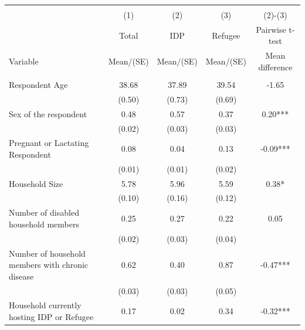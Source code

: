 
\begin{tabular}{@{\extracolsep{5pt}}lcccc}
\\[-1.8ex]\hline \hline \\[-1.8ex]
 & \multicolumn{1}{c}{(1)}  & \multicolumn{1}{c}{(2)}  & \multicolumn{1}{c}{(3)}  & \multicolumn{1}{c}{(2)-(3)} \\
 & \multicolumn{1}{c}{Total}  & \multicolumn{1}{c}{IDP}  & \multicolumn{1}{c}{Refugee}  & \multicolumn{1}{c}{Pairwise t-test}  \\
Variable & Mean/(SE) & Mean/(SE) & Mean/(SE) & Mean difference \\ \hline \\[-1.8ex] 
Respondent Age   & 38.68    & 37.89    & 39.54    & -1.65   \\
 & (0.50)  & (0.73)  & (0.69)  &  \\ [1ex]
Sex of the respondent   & 0.48    & 0.57    & 0.37    & 0.20***   \\
 & (0.02)  & (0.03)  & (0.03)  &  \\ [1ex]
Pregnant or Lactating Respondent   & 0.08    & 0.04    & 0.13    & -0.09***   \\
 & (0.01)  & (0.01)  & (0.02)  &  \\ [1ex]
Household Size   & 5.78    & 5.96    & 5.59    & 0.38*   \\
 & (0.10)  & (0.16)  & (0.12)  &  \\ [1ex]
Number of disabled household members   & 0.25    & 0.27    & 0.22    & 0.05   \\
 & (0.02)  & (0.03)  & (0.04)  &  \\ [1ex]
Number of household members with chronic disease   & 0.62    & 0.40    & 0.87    & -0.47***   \\
 & (0.03)  & (0.03)  & (0.05)  &  \\ [1ex]
Household currently hosting IDP or Refugee   & 0.17    & 0.02    & 0.34    & -0.32***   \\

\end{tabular}
